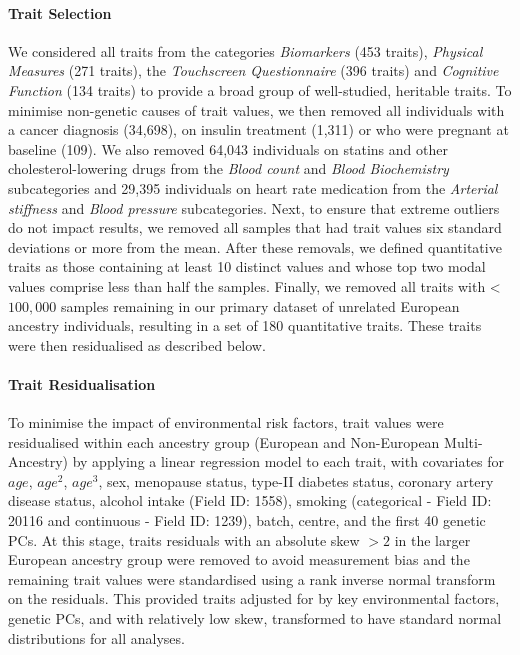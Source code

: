 \documentclass[12pt]{zHenriquesLab-StyleBioRxiv}
\begin{document}
\paragraph*{Trait Selection} 
We considered all traits from the categories \textit{Biomarkers} (453 traits), \textit{Physical Measures} (271 traits), the \textit{Touchscreen Questionnaire} (396 traits) and \textit{Cognitive Function} (134 traits) 
to provide a broad group of well-studied, heritable traits. To minimise non-genetic causes of trait values, we then removed all individuals with a cancer diagnosis (34,698), on insulin treatment (1,311) or who were pregnant at baseline (109). We also removed 64,043 individuals on statins and other cholesterol-lowering drugs from the \textit{Blood count} and \textit{Blood Biochemistry} subcategories and 29,395 individuals
on heart rate medication from the \textit{Arterial stiffness} and \textit{Blood pressure} subcategories.
Next, to ensure that extreme outliers do not impact results, we removed all samples that had trait values six standard deviations or more from the mean. After these removals, we defined quantitative traits as 
those containing at least 10 distinct values and whose top two modal values comprise less than 
half the samples. Finally, we removed all traits with < $100,000$ samples remaining in our 
primary dataset of unrelated European ancestry individuals, resulting in a set of 180 quantitative 
traits. These traits were then residualised as described below. 
%
\paragraph*{Trait Residualisation}
To minimise the impact of environmental risk factors, trait values were 
residualised within each ancestry group (European and Non-European Multi-Ancestry) by applying a linear regression 
model to each trait, with covariates for $age$, $age^2$, $age^3$, sex, menopause status, %
type-II diabetes status, coronary artery disease status, alcohol intake (Field ID: 1558), 
smoking (categorical - Field ID: 20116 and continuous - Field ID: 1239), 
batch, centre, and the first 40 genetic PCs.  
At this stage, traits residuals with an absolute skew $>2$ \cite{skew_book} 
in the larger European ancestry group were removed to avoid measurement bias and 
the remaining trait values were standardised using a rank inverse 
normal transform on the residuals. This provided traits adjusted for by key environmental factors, genetic 
PCs, and with relatively low skew, transformed to have standard normal distributions for all analyses. 
%
\end{document}
